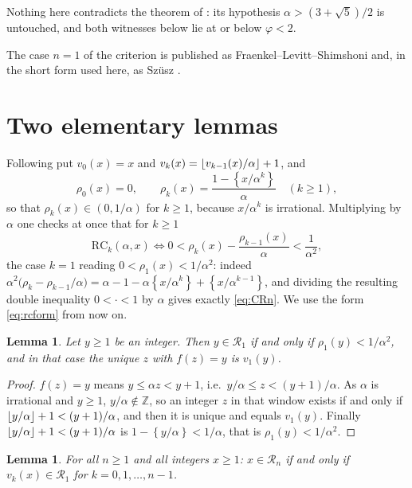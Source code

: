 \documentclass[11pt]{amsart}
\newtheorem{lemma}[theorem]{Lemma}
\theoremstyle{remark}
\DeclarePairedDelimiter{\fl}{\lfloor}{\rfloor}
\newcommand{\fp}[1]{\left\{#1\right\}}
\newcommand{\RC}{\mathrm{RC}}
\begin{document}
Nothing here contradicts the theorem of \cite{KVZ}: its hypothesis
$\alpha>(3+\sqrt5)/2$ is untouched, and both witnesses below lie at or below $\varphi<2$.

The case $n=1$ of the criterion is published as Fraenkel--Levitt--Shimshoni \cite{FLS}
and, in the short form used here, as Sz\"usz \cite{Szusz}.

\section{Two elementary lemmas}\label{sec:lemmas}

Following \cite{KVZ} put $v_0(x)=x$ and $v_k(x)=\fl{v_{k-1}(x)/\alpha}+1$, and
\[
 \rho_0(x)=0,\qquad
 \rho_k(x)=\frac{1-\fp{x/\alpha^{k}}}{\alpha}\quad(k\ge1),
\]
so that $\rho_k(x)\in(0,1/\alpha)$ for $k\ge1$, because $x/\alpha^{k}$ is irrational.
Multiplying by $\alpha$ one checks at once that for $k\ge1$
\begin{equation}\label{eq:rcform}
 \RC_k(\alpha,x)\iff
 0<\rho_k(x)-\frac{\rho_{k-1}(x)}{\alpha}<\frac1{\alpha^{2}},
\end{equation}
the case $k=1$ reading $0<\rho_1(x)<1/\alpha^{2}$: indeed
$\alpha^{2}\bigl(\rho_k-\rho_{k-1}/\alpha\bigr)
=\alpha-1-\alpha\fp{x/\alpha^{k}}+\fp{x/\alpha^{k-1}}$, and dividing the resulting
double inequality $0<\cdot<1$ by $\alpha$ gives exactly \eqref{eq:CRn}. We use the form
\eqref{eq:rcform} from now on.

\begin{lemma}\label{lem:R1}
Let $y\ge1$ be an integer. Then $y\in\mathcal R_1$ if and only if
$\rho_1(y)<1/\alpha^{2}$, and in that case the unique $z$ with $f(z)=y$ is $v_1(y)$.
\end{lemma}

\begin{proof}
$f(z)=y$ means $y\le\alpha z<y+1$, i.e.\ $y/\alpha\le z<(y+1)/\alpha$. As $\alpha$ is
irrational and $y\ge1$, $y/\alpha\notin\mathbb Z$, so an integer $z$ in that window
exists if and only if $\fl{y/\alpha}+1<(y+1)/\alpha$, and then it is unique and equals
$v_1(y)$. Finally $\fl{y/\alpha}+1<(y+1)/\alpha$ is $1-\fp{y/\alpha}<1/\alpha$, that is
$\rho_1(y)<1/\alpha^{2}$.
\end{proof}

\begin{lemma}\label{lem:tower}
For all $n\ge1$ and all integers $x\ge1$:
$x\in\mathcal R_n$ if and only if $v_k(x)\in\mathcal R_1$ for $k=0,1,\dots,n-1$.
\end{lemma}
\end{document}
